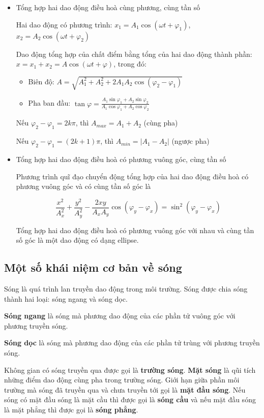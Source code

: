 \documentclass[12pt,a4paper]{article}
\begin{document}
\begin{itemize}
    \item Tổng hợp hai dao động điều hoà cùng phương, cùng tần số
    
    Hai dao động có phương trình: $x_1 = A_1 \cos(\omega t + \varphi_1)$, $x_2 = A_2 \cos(\omega t + \varphi_2)$

    Dao động tổng hợp của chất điểm bằng tổng của hai dao động thành phần: $x = x_1 + x_2 = A \cos(\omega t + \varphi)$, trong đó:
    \begin{itemize}
        \item Biên độ: $A = \sqrt{A_1^2 + A_2^2 + 2A_1 A_2 \cos(\varphi_2 - \varphi_1)}$
        \item Pha ban đầu: $\tan \varphi = \frac{A_1 \sin \varphi_1 + A_2 \sin \varphi_2}{A_1 \cos \varphi_1 + A_2 \cos \varphi_2}$
    \end{itemize}

    Nếu $\varphi_2 - \varphi_1 = 2k\pi$, thì $A_{max} = A_1 + A_2$ (cùng pha)

    Nếu $\varphi_2 - \varphi_1 = (2k+1)\pi$, thì $A_{min} = |A_1 - A_2|$ (ngược pha)

    \item Tổng hợp hai dao động điều hoà có phương vuông góc, cùng tần số
    
    Phương trình quĩ đạo chuyển động tổng hợp của hai dao động điều hoà có phương vuông góc và có cùng tần số góc là

    $$\frac{x^2}{A_x^2} + \frac{y^2}{A_y^2} - \frac{2xy}{A_x A_y} \cos(\varphi_y - \varphi_x) = \sin^2(\varphi_y - \varphi_x)$$

    Tổng hợp hai dao động điều hoà có phương vuông góc với nhau và cùng tần số góc là một
dao động có dạng ellipse.
\end{itemize}

\subsection*{Một số khái niệm cơ bản về sóng}

Sóng là quá trình lan truyền dao động trong môi trường. Sóng được chia sóng thành hai loại: sóng ngang và sóng dọc.

\textbf{Sóng ngang} là sóng mà phương dao động của các phần tử vuông góc với phương truyền
sóng.

\textbf{Sóng dọc} là sóng mà phương dao động của các phần tử trùng với phương truyền sóng.

Không gian có sóng truyền qua được gọi là \textbf{trường sóng}. \textbf{Mặt sóng} là qũi tích những điểm dao
động cùng pha trong trường sóng. Giới hạn giữa phần môi trường mà sóng đã truyền qua và
chưa truyền tới gọi là \textbf{mặt đầu sóng}. Nếu sóng có mặt đầu sóng là mặt cầu thì được gọi là \textbf{sóng
cầu} và nếu mặt đầu sóng là mặt phẳng thì được gọi là \textbf{sóng phẳng}.
\end{document}
